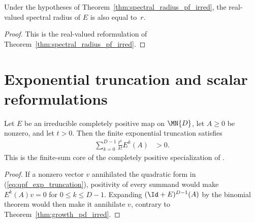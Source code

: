 \begin{theorem}
    \label{thm:spectral_radius_real_pf_irred}
    \leanok
    Under the hypotheses of Theorem~\ref{thm:spectral_radius_pf_irred}, the
    real-valued spectral radius of $E$ is also equal to~$r$.
\end{theorem}

\begin{proof}
    \leanok
    This is the real-valued reformulation of
    Theorem~\ref{thm:spectral_radius_pf_irred}.
\end{proof}

\section{Exponential truncation and scalar reformulations}
\label{sec:app_qpf_exponential}

\begin{theorem}
    \label{thm:exp_truncation_pd_irred}
    \leanok
    Let $E$ be an irreducible completely positive map on $\MN{D}$,
    let $A \ge 0$ be nonzero, and let $t > 0$.
    Then the finite exponential truncation satisfies
    \begin{align}
        \sum_{k=0}^{D-1}\frac{t^k}{k!}E^k(A)
         & >0.
        \label{eq:qpf_exp_truncation}
    \end{align}
    This is the finite-sum core of the completely positive specialization of
    \cite[Theorem~6.2(3)]{Wolf2012Quantum}.
\end{theorem}

\begin{proof}
    \leanok
    If a nonzero vector $v$ annihilated the quadratic form in
    (\ref{eq:qpf_exp_truncation}), positivity of every summand would make
    $E^k(A)v=0$ for $0\leq k\leq D-1$. Expanding
    $(\Id+E)^{D-1}(A)$ by the binomial theorem would then make it annihilate
    $v$, contrary to Theorem~\ref{thm:growth_pd_irred}.
\end{proof}
